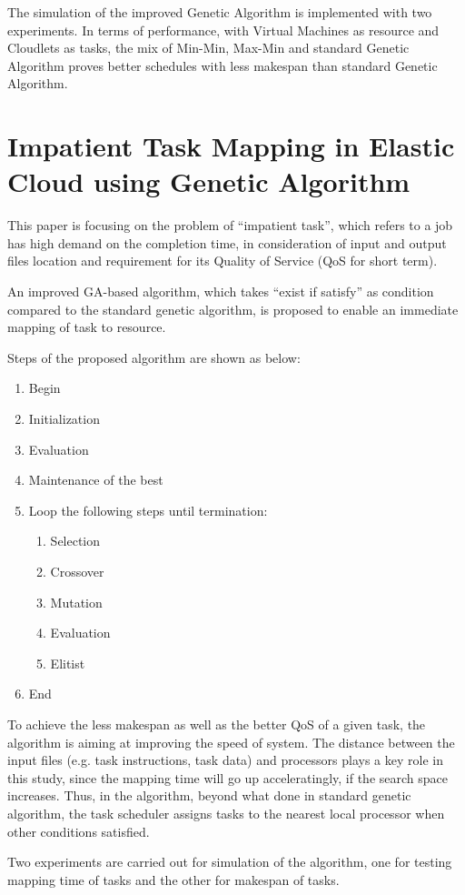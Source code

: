 \documentclass[10pt,twoside,openright,logo]{report}
\begin{document}
The simulation of the improved Genetic Algorithm is implemented with two experiments. In terms of performance, with Virtual Machines as resource and Cloudlets as tasks, the mix of Min-Min, Max-Min and standard Genetic Algorithm proves better schedules with less makespan than standard Genetic Algorithm.

\section{Impatient Task Mapping in Elastic Cloud using Genetic Algorithm \cite{2}}
This paper is focusing on the problem of “impatient task”, which refers to a job has high demand on the completion time, in consideration of input and output files location and requirement for its Quality of Service (QoS for short term).

An improved GA-based algorithm, which takes “exist if satisfy” as condition compared to the standard genetic algorithm, is proposed to enable an immediate mapping of task to resource.

Steps of the proposed algorithm are shown as below:
\begin{enumerate}
	\item Begin
	\item Initialization
	\item Evaluation
	\item Maintenance of the best
	\item Loop the following steps until termination:
	\begin{enumerate}
		\item Selection
		\item Crossover
		\item Mutation
		\item Evaluation
		\item Elitist
	\end{enumerate}
	\item End
\end{enumerate}
To achieve the less makespan as well as the better QoS of a given task, the algorithm is aiming at improving the speed of system. The distance between the input files (e.g. task instructions, task data) and processors plays a key role in this study, since the mapping time will go up acceleratingly, if the search space increases. Thus, in the algorithm, beyond what done in standard genetic algorithm, the task scheduler assigns tasks to the nearest local processor when other conditions satisfied.

Two experiments are carried out for simulation of the algorithm, one for testing mapping time of tasks and the other for makespan of tasks.
\end{document}
